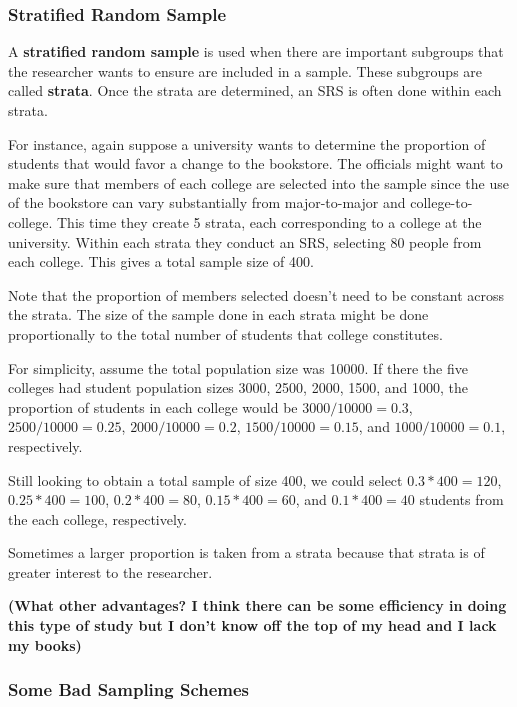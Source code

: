 \documentclass[
]{book}
\theoremstyle{definition}
\theoremstyle{definition}
\theoremstyle{definition}
\theoremstyle{remark}
\begin{document}
\hypertarget{stratified-random-sample}{%
\subsubsection{Stratified Random Sample}\label{stratified-random-sample}}

A \textbf{stratified random sample} is used when there are important subgroups that the researcher wants to ensure are included in a sample. These subgroups are called \textbf{strata}. Once the strata are determined, an SRS is often done within each strata.

For instance, again suppose a university wants to determine the proportion of students that would favor a change to the bookstore. The officials might want to make sure that members of each college are selected into the sample since the use of the bookstore can vary substantially from major-to-major and college-to-college. This time they create 5 strata, each corresponding to a college at the university. Within each strata they conduct an SRS, selecting 80 people from each college. This gives a total sample size of 400.

Note that the proportion of members selected doesn't need to be constant across the strata. The size of the sample done in each strata might be done proportionally to the total number of students that college constitutes.

For simplicity, assume the total population size was 10000. If there the five colleges had student population sizes 3000, 2500, 2000, 1500, and 1000, the proportion of students in each college would be \(3000/10000 = 0.3\), \(2500/10000 = 0.25\), \(2000/10000=0.2\), \(1500/10000=0.15\), and \(1000/10000=0.1\), respectively.

Still looking to obtain a total sample of size 400, we could select \(0.3*400 = 120\), \(0.25*400 = 100\), \(0.2*400 = 80\), \(0.15*400 = 60\), and \(0.1*400 = 40\) students from the each college, respectively.

Sometimes a larger proportion is taken from a strata because that strata is of greater interest to the researcher.

\textbf{(What other advantages? I think there can be some efficiency in doing this type of study but I don't know off the top of my head and I lack my books)}

\hypertarget{some-bad-sampling-schemes}{%
\subsubsection{Some Bad Sampling Schemes}\label{some-bad-sampling-schemes}}
\end{document}
